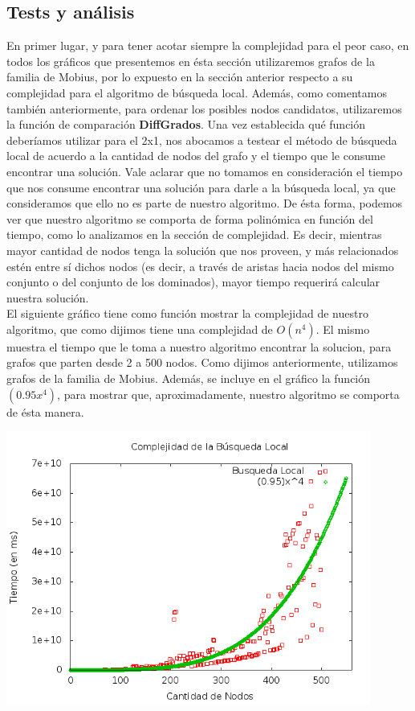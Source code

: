 \subsection{Tests y análisis}
En primer lugar, y para tener acotar siempre la complejidad para el peor caso, en todos los gráficos que presentemos en ésta sección utilizaremos grafos de la familia de Mobius, por lo expuesto en la sección anterior respecto a su complejidad para el algoritmo de búsqueda local. Además, como comentamos también anteriormente, para ordenar los posibles nodos candidatos, utilizaremos la función de comparación \textbf{DiffGrados}.
Una vez establecida qué función deberíamos utilizar para el 2x1, nos abocamos a testear el método de búsqueda local de acuerdo a la cantidad de nodos del grafo y el tiempo que le consume encontrar una solución. Vale aclarar que no tomamos en consideración el tiempo que nos consume encontrar una solución para darle a la búsqueda local, ya que consideramos que ello no es parte de nuestro algoritmo. De ésta forma, podemos ver que nuestro algoritmo se comporta de forma polinómica en función del tiempo, como lo analizamos en la sección de complejidad. Es decir, mientras mayor cantidad de nodos tenga la solución que nos proveen, y más relacionados estén entre sí dichos nodos (es decir, a través de aristas hacia nodos del mismo conjunto o del conjunto de los dominados), mayor tiempo requerirá calcular nuestra solución. \\
El siguiente gráfico tiene como función mostrar la complejidad de nuestro algoritmo, que como dijimos tiene una complejidad de $O(n^4)$. El mismo muestra el tiempo que le toma a nuestro algoritmo encontrar la solucion, para grafos que parten desde 2 a 500 nodos. Como dijimos anteriormente, utilizamos grafos de la familia de Mobius. Además, se incluye en el gráfico la función $(0.95x^4)$, para mostrar que, aproximadamente, nuestro algoritmo se comporta de ésta manera.  \\
\begin{center}
\includegraphics[width=12cm]{./graficos/complejidadLocal.png}
\end{center}

